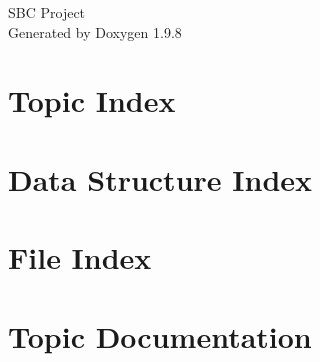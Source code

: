 \documentclass[twoside]{book}
\newcommand{\+}{\discretionary{\mbox{\scriptsize$\hookleftarrow$}}{}{}}
\newcommand{\clearemptydoublepage}{%
    \newpage{\pagestyle{empty}\cleardoublepage}%
  }
\begin{document}
  \raggedbottom
    \hypersetup{pageanchor=false,
                bookmarksnumbered=true,
                pdfencoding=unicode
               }
  \begin{titlepage}
  \vspace*{7cm}
  \begin{center}%
  {\Large SBC Project}\\
  \vspace*{1cm}
  {\large Generated by Doxygen 1.9.8}\\
  \end{center}
  \end{titlepage}
  \clearemptydoublepage
  \tableofcontents
  \clearemptydoublepage
  \hypersetup{pageanchor=true}




\chapter{Topic Index}

\chapter{Data Structure Index}

\chapter{File Index}

\chapter{Topic Documentation}





\end{document}
